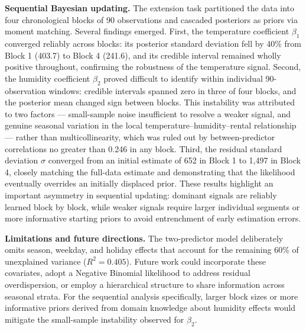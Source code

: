 \textbf{Sequential Bayesian updating.} The extension task partitioned the data
into four chronological blocks of 90 observations and cascaded posteriors as
priors via moment matching. Several findings emerged. First, the temperature
coefficient $\beta_1$ converged reliably across blocks: its posterior standard
deviation fell by 40\% from Block 1 (403.7) to Block 4 (241.6), and its
credible interval remained wholly positive throughout, confirming the robustness
of the temperature signal. Second, the humidity coefficient $\beta_2$ proved
difficult to identify within individual 90-observation windows: credible intervals
spanned zero in three of four blocks, and the posterior mean changed sign between
blocks. This instability was attributed to two factors --- small-sample noise
insufficient to resolve a weaker signal, and genuine seasonal variation in the
local temperature--humidity--rental relationship --- rather than
multicollinearity, which was ruled out by between-predictor correlations no
greater than 0.246 in any block. Third, the residual standard deviation $\sigma$
converged from an initial estimate of 652 in Block 1 to 1{,}497 in Block 4,
closely matching the full-data estimate and demonstrating that the likelihood
eventually overrides an initially displaced prior. These results highlight an
important asymmetry in sequential updating: dominant signals are reliably learned
block by block, while weaker signals require larger individual segments or more
informative starting priors to avoid entrenchment of early estimation errors.

\textbf{Limitations and future directions.} The two-predictor model deliberately
omits season, weekday, and holiday effects that account for the remaining 60\%
of unexplained variance ($R^2 = 0.405$). Future work could incorporate these
covariates, adopt a Negative Binomial likelihood to address residual
overdispersion, or employ a hierarchical structure to share information across
seasonal strata. For the sequential analysis specifically, larger block sizes
or more informative priors derived from domain knowledge about humidity effects
would mitigate the small-sample instability observed for $\beta_2$.
